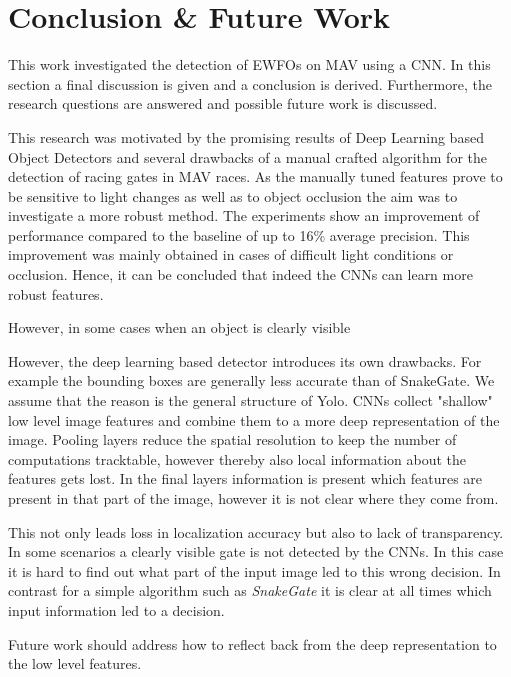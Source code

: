 \chapter{Conclusion \& Future Work}
\label{sec:conclusion}
This work investigated the detection of \acp{EWFO} on \ac{MAV} using a \ac{CNN}. In this section a final discussion is given and a conclusion is derived. Furthermore, the research questions are answered and possible future work is discussed.

This research was motivated by the promising results of Deep Learning based Object Detectors and several drawbacks of a manual crafted algorithm for the detection of racing gates in \ac{MAV} races. As the manually tuned features prove to be sensitive to light changes as well as to object occlusion the aim was to investigate a more robust method. The experiments show an improvement of performance compared to the baseline of up to 16\% average precision. This improvement was mainly obtained in cases of difficult light conditions or occlusion. Hence, it can be concluded that indeed the \acp{CNN} can learn more robust features.

However, in some cases when an object is clearly visible

However, the deep learning based detector introduces its own drawbacks. For example the bounding boxes are generally less accurate than of SnakeGate. We assume that the reason is the general structure of \ac{Yolo}. \acp{CNN} collect "shallow" low level image features and combine them to a more deep representation of the image. Pooling layers reduce the spatial resolution to keep the number of computations tracktable, however thereby also local information about the features gets lost. In the final layers information is present which features are present in that part of the image, however it is not clear where they come from. 

This not only leads loss in localization accuracy but also to lack of transparency. In some scenarios a clearly visible gate is not detected by the \acp{CNN}. In this case it is hard to find out what part of the input image led to this wrong decision. In contrast for a simple algorithm such as  \textit{SnakeGate} it is clear at all times which input information led to a decision.

Future work should address how to reflect back from the deep representation to the low level features.

